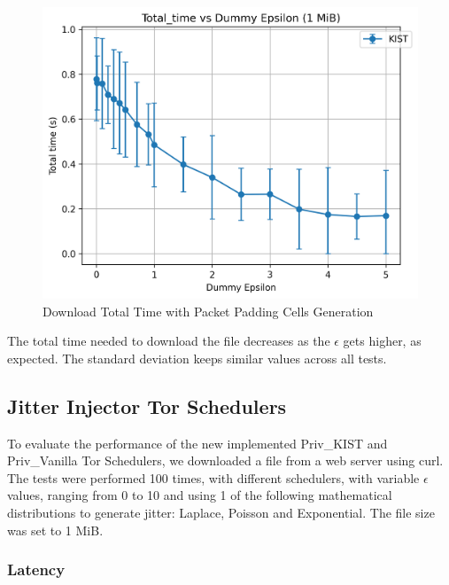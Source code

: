 \begin{figure}[htbp]
    \centering
    \includegraphics[scale=0.4]{Chapters/Figures/Plots/Dummy/total_time_dummy_1_mib.png}
    \caption{Download Total Time with Packet Padding Cells Generation}\label{fig:dummy_total_time_tls_packets}
\end{figure}

The total time needed to download the file decreases as the $\epsilon$ gets higher, as expected. The standard deviation keeps similar values across all tests.

\subsection{Jitter Injector Tor Schedulers}\label{sec:performance_evaluation_jitter_injectors_tor_schedulers}

To evaluate the performance of the new implemented Priv\_KIST and Priv\_Vanilla Tor Schedulers, we downloaded a file from a web server using curl. The tests were performed 100 times, with different schedulers, with variable $\epsilon$ values, ranging from 0 to 10 and using 1 of the following mathematical distributions to generate jitter: Laplace, Poisson and Exponential. The file size was set to 1 MiB.

\subsubsection{Latency}\label{sec:performance_evaluation_latency_jitter_injectors_tor_schedulers}

